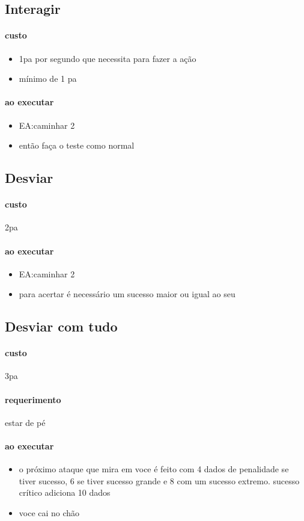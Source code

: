 \subsection{Interagir}
\paragraph{custo}
\begin{itemize}
  \item 1pa por segundo que necessita para fazer a ação
  \item mínimo de 1 pa
\end{itemize}
\paragraph{ao executar}
\begin{itemize}
  \item EA:caminhar 2 
  \item então faça o teste como normal
\end{itemize}
%
\subsection{Desviar}
\paragraph{custo} 2pa
\paragraph{ao executar}
\begin{itemize}
  \item EA:caminhar 2
  \item para acertar é necessário um sucesso maior ou igual ao seu
\end{itemize}
%
\subsection{Desviar com tudo}
\paragraph{custo} 3pa
\paragraph{requerimento} estar de pé 
\paragraph{ao executar} 
\begin{itemize}
  \item o próximo ataque que mira em voce é feito com 4 dados de penalidade se tiver sucesso, 
    6 se tiver sucesso grande e 8 com um sucesso extremo. sucesso crítico adiciona 10 dados %
  \item voce cai no chão
\end{itemize}
%
